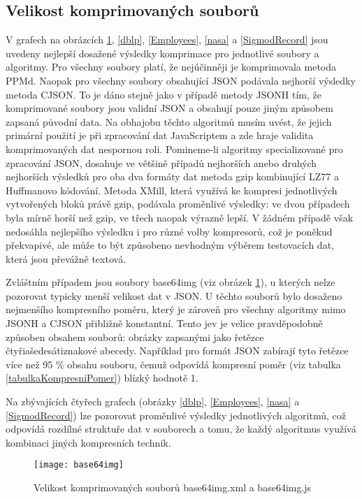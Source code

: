 \subsection{Velikost komprimovaných souborů}
V grafech na obrázcích \ref{base64img}, \ref{dblp}, \ref{Employees}, \ref{nasa} a \ref{SigmodRecord} jsou uvedeny nejlepší dosažené výsledky komprimace pro jednotlivé soubory a algoritmy. Pro všechny soubory platí, že nejúčinněji je komprimovala metoda PPMd. Naopak pro všechny soubory obsahující JSON podávala nejhorší výsledky metoda CJSON. To je dáno stejně jako v případě metody JSONH tím, že komprimované soubory jsou validní JSON a obsahují pouze jiným způsobem zapsaná původní data. Na obhajobu těchto algoritmů musím uvést, že jejich primární použití je při zpracování dat JavaScriptem a zde hraje validita komprimovaných dat nespornou roli. Pomineme-li algoritmy specializované pro zpracování JSON, dosahuje ve většině případů nejhorších anebo druhých nejhorších výsledků pro oba dva formáty dat metoda gzip kombinující LZ77 a Huffmanovo kódování. Metoda XMill, která využívá ke kompresi jednotlivých vytvořených bloků právě gzip, podávala proměnlivé výsledky: ve dvou případech byla mírně horší než gzip, ve třech naopak výrazně lepší. V žádném případě však nedosáhla nejlepšího výsledku i pro různé volby kompresorů, což je poněkud překvapivé, ale může to být způsobeno nevhodným výběrem testovacích dat, která jsou převážně textová.

Zvláštním případem jsou soubory base64img (viz obrázek \ref{base64img}), u kterých nelze pozorovat typicky menší velikost dat v JSON. U těchto souborů bylo dosaženo nejmenšího kompresního poměru, který je zároveň pro všechny algoritmy mimo JSONH a CJSON přibližně konstantní. Tento jev je velice pravděpodobně způsoben obsahem souborů: obrázky zapsanými jako řetězce čtyřiašedesátiznakové abecedy. Například pro formát JSON zabírají tyto řetězce více než 95 \% obsahu souboru, čemuž odpovídá kompresní poměr (viz tabulka \ref{tabulkaKompresniPomer}) blízký hodnotě 1.

Na zbývajících čtyřech grafech (obrázky \ref{dblp}, \ref{Employees}, \ref{nasa} a \ref{SigmodRecord}) lze pozorovat proměnlivé výsledky jednotlivých algoritmů, což odpovídá rozdílné struktuře dat v souborech a tomu, že každý algoritmus využívá kombinaci jiných kompresních technik.

\begin{figure}[!h]
\centering
\texttt{[image: base64img]}
\caption{Velikost komprimovaných souborů base64img.xml a base64img.js}
\label{base64img}
\end{figure}

